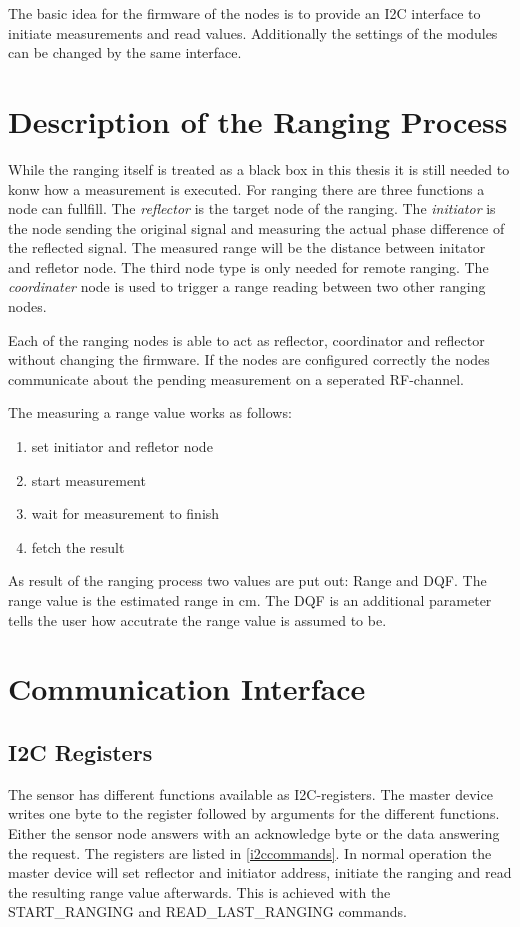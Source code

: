 
The basic idea for the firmware of the nodes is to provide an I2C interface to initiate measurements and read values.
Additionally the settings of the modules can be changed by the same interface.

\section{Description of the Ranging Process}

While the ranging itself is treated as a black box in this thesis it is still needed to konw how a measurement is executed.
For ranging there are three functions a node can fullfill.
The \emph{reflector} is the target node of the ranging.
The \emph{initiator} is the node sending the original signal and measuring the actual phase difference of the reflected signal.
The measured range will be the distance between initator and refletor node.
The third node type is only needed for remote ranging.
The \emph{coordinater} node is used to trigger a range reading between two other ranging nodes.

Each of the ranging nodes is able to act as reflector, coordinator and reflector without changing the firmware.
If the nodes are configured correctly the nodes communicate about the pending measurement on a seperated RF-channel.

The measuring a range value works as follows:
\begin{enumerate}
	\item set initiator and refletor node
	\item start measurement
	\item wait for measurement to finish
	\item fetch the result
\end{enumerate}

As result of the ranging process two values are put out: Range and DQF.
The range value is the estimated range in cm.
The DQF is an additional parameter tells the user how accutrate the range value is assumed to be.

\section{Communication Interface}


\subsection{I2C Registers}
The sensor has different functions available as I2C-registers.
The master device writes one byte to the register followed by arguments for the different functions.
Either the sensor node answers with an acknowledge byte or the data answering the request.
The registers are listed in \autoref{i2ccommands}.
In normal operation the master device will set reflector and initiator address, initiate the ranging and read the resulting range value afterwards.
This is achieved with the START\_RANGING and READ\_LAST\_RANGING commands.

